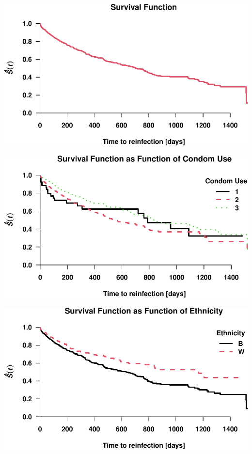\documentclass[
]{article}
\begin{document}
\includegraphics{practical_files/figure-latex/unnamed-chunk-1-1.pdf}

\includegraphics{practical_files/figure-latex/unnamed-chunk-2-1.pdf}

\includegraphics{practical_files/figure-latex/unnamed-chunk-3-1.pdf}
\end{document}
